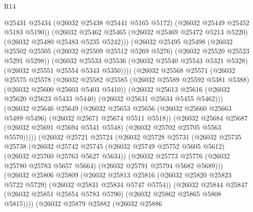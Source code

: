 \begin{lexlean}{R14}
\begin{coremodule}
{{{{{{{{{{{{{{{{{{{{{{{{{{{{{{{{{{{{{{{{{{{{{{{{{{{{{{{{{{{{{{{{{{{{{{{{{{{{{{{{{{                @25431
                @25434
                (@26032 @25438 @25441 @5165 @5172)
                (@26032 @25449 @25452 @5183 @5190))
              (@26032
                @25462
                @25465
                (@26032 @25469 @25472 @5213 @5220)
                (@26032 @25480 @25483 @5235 @5242)))
            (@26032
              @25495
              @25498
              (@26032
                @25502
                @25505
                (@26032 @25509 @25512 @5269 @5276)
                (@26032 @25520 @25523 @5291 @5298))
              (@26032
                @25533
                @25536
                (@26032 @25540 @25543 @5321 @5328)
                (@26032 @25551 @25554 @5343 @5350))))
          (@26032
            @25568
            @25571
            (@26032
              @25575
              @25578
              (@26032
                @25582
                @25585
                (@26032 @25589 @25592 @5381 @5388)
                (@26032 @25600 @25603 @5403 @5410))
              (@26032
                @25613
                @25616
                (@26032 @25620 @25623 @5433 @5440)
                (@26032 @25631 @25634 @5455 @5462)))
            (@26032
              @25646
              @25649
              (@26032
                @25653
                @25656
                (@26032 @25660 @25663 @5489 @5496)
                (@26032 @25671 @25674 @5511 @5518))
              (@26032
                @25684
                @25687
                (@26032 @25691 @25694 @5541 @5548)
                (@26032 @25702 @25705 @5563 @5570)))))
        (@26032
          @25721
          @25724
          (@26032
            @25728
            @25731
            (@26032
              @25735
              @25738
              (@26032
                @25742
                @25745
                (@26032 @25749 @25752 @5605 @5612)
                (@26032 @25760 @25763 @5627 @5634))
              (@26032
                @25773
                @25776
                (@26032 @25780 @25783 @5657 @5664)
                (@26032 @25791 @25794 @5682 @5689)))
            (@26032
              @25806
              @25809
              (@26032
                @25813
                @25816
                (@26032 @25820 @25823 @5722 @5729)
                (@26032 @25831 @25834 @5747 @5754))
              (@26032
                @25844
                @25847
                (@26032 @25851 @25854 @5783 @5790)
                (@26032 @25862 @25865 @5808 @5815))))
          (@26032
            @25879
            @25882
            (@26032
              @25886
}}}}}}}}}}}}}}}}}}}}}}}}}}}}}}}}}}}}}}}}}}}}}}}}}}}}}}}}}}}}}}}}}}}}}}}}}}}}}}}}}}
\end{coremodule}
\end{lexlean}
